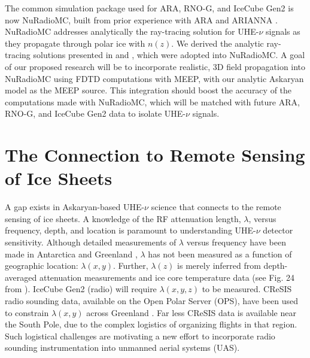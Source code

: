 \documentclass[11pt]{amsart}
\begin{document}
The common simulation package used for ARA, RNO-G, and IceCube Gen2 is now NuRadioMC, built from prior experience with ARA and ARIANNA \cite{10.1140/epjc/s10052-020-7612-8,10.1109/tns.2015.2468182,10.1016/j.astropartphys.2011.11.010,10.1016/j.astropartphys.2015.04.002,10.1103/physrevd.102.043021}.  NuRadioMC addresses analytically the ray-tracing solution for UHE-$\nu$ signals as they propagate through polar ice with $n(z)$.  We derived the analytic ray-tracing solutions presented in \cite{10.1140/epjc/s10052-020-7612-8} and \cite{horizPaper}, which were adopted into NuRadioMC.  A goal of our proposed research will be to incorporate realistic, 3D field propagation into NuRadioMC using FDTD computations with MEEP, with our analytic Askaryan model as the MEEP source.  This integration should boost the accuracy of the computations made with NuRadioMC, which will be matched with future ARA, RNO-G, and IceCube Gen2 data to isolate UHE-$\nu$ signals.

\section{The Connection to Remote Sensing of Ice Sheets}
\label{sec:cresis}

A gap exists in Askaryan-based UHE-$\nu$ science that connects to the remote sensing of ice sheets.  A knowledge of the RF attenuation length, $\lambda$, versus frequency, depth, and location is paramount to understanding UHE-$\nu$ detector sensitivity.  Although detailed measurements of $\lambda$ versus frequency have been made in Antarctica and Greenland \cite{aguilar_2022,10.3189/2015jog14j214,10.3189/2015jog15j057,barwick_besson_gorham_saltzberg_2005}, $\lambda$ has not been measured as a function of geographic location: $\lambda(x,y)$.  Further, $\lambda(z)$ is merely inferred from depth-averaged attenuation measurements and ice core temperature data (see Fig. 24 from \cite{10.1016/j.astropartphys.2011.11.010}). IceCube Gen2 (radio) will require $\lambda(x,y,z)$ to be measured.  CReSIS radio sounding data, available on the Open Polar Server (OPS), have been used to constrain $\lambda(x,y)$ across Greenland \cite{10.1002/2015rs005849}.  Far less CReSIS data is available near the South Pole, due to the complex logistics of organizing flights in that region.  Such logistical challenges are motivating a new effort to incorporate radio sounding instrumentation into unmanned aerial systems (UAS). 
\end{document}
